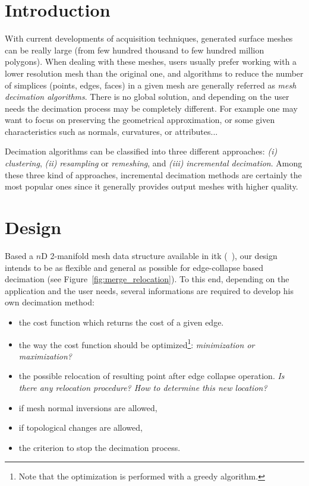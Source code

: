 \documentclass{InsightArticle}
\theoremstyle{plain}
\begin{document}
\section{Introduction}
With current developments of acquisition techniques, generated surface meshes can be really large (from few hundred thousand to few hundred million polygons). When dealing with these meshes, users usually prefer working with a lower resolution mesh than the original one, and algorithms to reduce the number of simplices (points, edges, faces) in a given mesh are generally referred as \emph{mesh decimation algorithms}. There is no global solution, and depending on the user needs the decimation process may be completely different. For example one may want to focus on preserving the geometrical approximation, or some given characteristics such as normals, curvatures, or attributes...

Decimation algorithms can be classified into three different approaches: \textit{(i)} \emph{clustering}, \textit{(ii)} \emph{resampling} or \emph{remeshing}, and \textit{(iii)} \emph{incremental decimation}. Among these three kind of approaches, incremental decimation methods are certainly the most popular ones since it generally provides output meshes with higher quality.

\section{Design}
Based a $n$D 2-manifold mesh data structure available in itk (~\cite{itkQE}), our design intends to be as flexible and general as possible for edge-collapse based decimation (see Figure~\ref{fig:merge_relocation}). To this end, depending on the application and the user needs, several informations are required to develop his own decimation method:
\begin{itemize}
 \item the cost function which returns the cost of a given edge.
 \item the way the cost function should be optimized\footnote{Note that the optimization is performed with a greedy algorithm.}: \textit{minimization or maximization?}
 \item the possible relocation of resulting point after edge collapse operation. \textit{Is there any relocation procedure? How to determine this new location?}
 \item if mesh normal inversions are allowed,
 \item if topological changes are allowed,
 \item the criterion to stop the decimation process.
\end{itemize}
\end{document}

